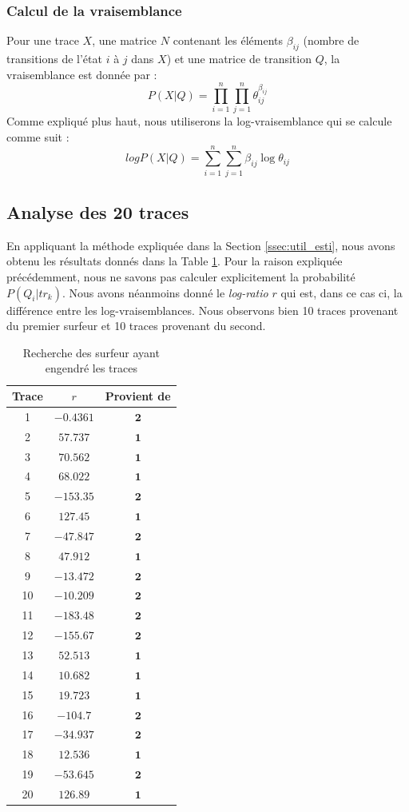 \documentclass[a4paper,titlepage]{report}
\begin{document}
\subsubsection{Calcul de la vraisemblance}
Pour une trace $X$, une matrice $N$ contenant les éléments $\beta_{ij}$ (nombre de transitions de l'état $i$ à $j$ dans $X$) et une matrice de transition $Q$, la vraisemblance est donnée par : 
\[
P(X|Q) = \prod\limits_{i = 1}^n \prod\limits_{j = 1}^n \theta_{ij}^{\beta_{ij}}
\]
Comme expliqué plus haut, nous utiliserons la log-vraisemblance qui se calcule comme suit :
\[
log P(X|Q) = \sum\limits_{i = 1}^n\sum\limits_{j = 1}^n \beta_{ij} \log \theta_{ij}
\]

\subsection{Analyse des 20 traces}
En appliquant la méthode expliquée dans la Section \ref{ssec:util_esti}, nous avons obtenu les résultats donnés dans la Table \ref{tab:surf_trace}. Pour la raison expliquée précédemment, nous ne savons pas calculer explicitement la probabilité $ P(Q_i|tr_k)$. Nous avons néanmoins donné le \textit{log-ratio} $r$ qui est, dans ce cas ci, la différence entre les log-vraisemblances.
Nous observons bien 10 traces provenant du premier surfeur et 10 traces provenant du second.
\begin{table}[ht]
	\center
	\begin{tabular}{|c|cc|}
		\hline
		Trace & $r$ & Provient de \\
		\hline
		1 & $ -0.4361$ & $\mathbf{2}$ \\
		2 & $57.737$ & $\mathbf{1}$ \\
		3 & $70.562$ & $\mathbf{1}$ \\
		4 & $68.022$ & $\mathbf{1}$ \\
		5 & $-153.35$ & $\mathbf{2}$ \\
		6 & $127.45$ & $\mathbf{1}$ \\
		7 & $-47.847$ & $\mathbf{2}$ \\
		8 & $47.912$ & $\mathbf{1}$ \\
		9 & $-13.472$ & $\mathbf{2}$ \\
		10 & $-10.209$ & $\mathbf{2}$ \\
		11 & $-183.48$ & $\mathbf{2}$ \\
		12 & $-155.67$ & $\mathbf{2}$ \\
		13 & $52.513$ & $\mathbf{1}$ \\
		14 & $10.682$ & $\mathbf{1}$ \\
		15 & $19.723$ & $\mathbf{1}$ \\
		16 & $-104.7$ & $\mathbf{2}$ \\
		17 & $-34.937$ & $\mathbf{2}$ \\
		18 & $12.536$ & $\mathbf{1}$ \\
		19 & $-53.645$ & $\mathbf{2}$ \\
		20 & $126.89$ & $\mathbf{1}$ \\
		\hline
	\end{tabular}
	\caption{Recherche des surfeur ayant engendré les traces}
	\label{tab:surf_trace}
\end{table}
\end{document}
